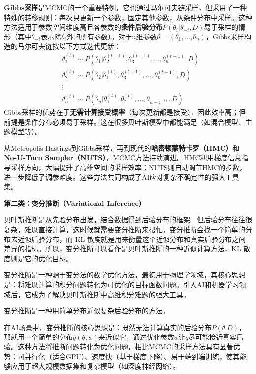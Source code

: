 \textbf{Gibbs采样}是MCMC的一个重要特例，它也通过马尔可夫链采样，但采用了一种特殊的转移规则：每次只更新一个参数，固定其他参数，从条件分布中采样。这种方法适用于参数空间维度高且各参数的\textbf{条件后验分布}$P(\theta_i | \theta_{-i}, D)$易于采样的情形（其中$\theta_{-i}$表示除$\theta_i$外的所有参数）。对于$n$维参数$\theta = (\theta_1, \ldots, \theta_n)$，Gibbs采样构造的马尔可夫链按以下方式迭代更新：
\begin{align*}
& \theta_1^{(t)} \sim P(\theta_1 | \theta_2^{(t-1)}, \theta_3^{(t-1)}, \ldots, \theta_n^{(t-1)}, D) \\
& \theta_2^{(t)} \sim P(\theta_2 | \theta_1^{(t)}, \theta_3^{(t-1)}, \ldots, \theta_n^{(t-1)}, D) \\
& \vdots \\
& \theta_n^{(t)} \sim P(\theta_n | \theta_1^{(t)}, \theta_2^{(t)}, \ldots, \theta_{n-1^{(t)}}, D)
\end{align*}
Gibbs采样的优势在于\textbf{无需计算接受概率}（每次更新都是接受），因此效率高；但前提是条件分布必须易于采样。这在很多贝叶斯模型中都能满足（如混合模型、主题模型等）。

从Metropolis-Hastings到Gibbs采样，再到现代的\textbf{哈密顿蒙特卡罗（HMC）}和\textbf{No-U-Turn Sampler（NUTS）}，MCMC方法持续演进。HMC利用梯度信息指导采样方向，大幅提升了高维空间的采样效率；NUTS则自动调节HMC的步数，进一步降低了调参难度。这些方法共同构成了AI应对复杂不确定性的强大工具集。

\textbf{第二类：变分推断（Variational Inference）}


贝叶斯推断是从先验分布出发，结合数据得到后验分布的框架。但后验分布往往很复杂，难以直接计算，这时候就需要变分推断来帮忙。变分推断会找一个简单的分布去近似后验分布，而 KL 散度就是用来衡量这个近似分布和真实后验分布之间差异的指标。所以，变分推断可以看作是贝叶斯推断的一种近似计算方法，KL 散度则是它的优化目标。

变分推断是一种源于变分法的数学优化方法，最初用于物理学领域，其核心思想是：将难以计算的积分问题转化为可优化的目标函数问题。引入AI和机器学习领域后，它成为了解决贝叶斯推断中高维积分难题的强大工具。

变分推断是一种用简单分布近似复杂后验分布的方法。

在AI场景中，变分推断的核心思想是：既然无法计算真实的后验分布$P(\theta|D)$，那就用一个简单的分布$q(\theta;\phi)$来近似它，通过优化参数$\phi$让$q$尽可能接近真实后验。这种方法将推断问题转化为优化问题，相比MCMC的采样方法具有显著优势：可并行化（适合GPU）、速度快（基于梯度下降）、易于端到端训练，使其能够应用于超大规模数据集和复杂模型（如深度神经网络）。

